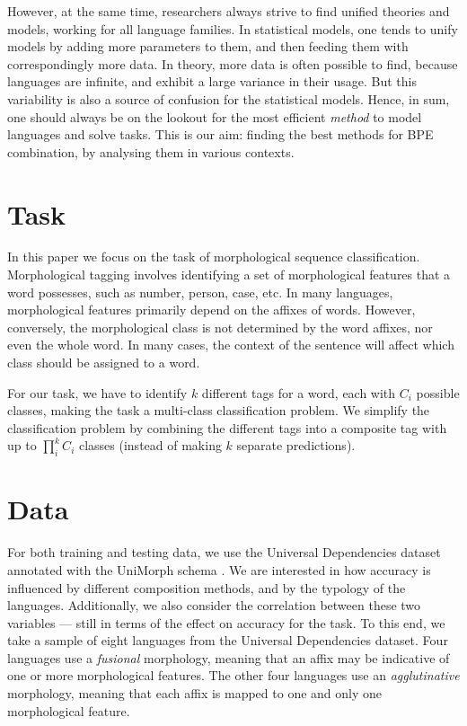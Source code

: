 \documentclass[11pt]{article}
\newcommand\citep{\cite}
\begin{document}
     However, at the same time, researchers always strive
     to find unified theories and models, working for all language
     families.
     In statistical models, one tends to unify models by adding more
     parameters to them, and then feeding them with correspondingly
     more data.  In theory, more data is often possible to find,
     because languages are infinite, and exhibit a large variance in
     their usage. But this variability is also a source of confusion
     for the statistical models. Hence, in sum, one should always be
     on the lookout for the most efficient \emph{method} to model
     languages and solve tasks. This is our aim: finding the best
     methods for BPE combination, by analysing them in various
     contexts.

    \section{Task}
             In this paper we focus on the task of
     morphological sequence classification. Morphological tagging
     involves identifying a set of morphological features that a word
     possesses, such as number, person, case, etc. In many languages,
     morphological features primarily depend on the affixes of
     words. However, conversely, the morphological class is not
     determined by the word affixes, nor even the whole word. In many
     cases, the context of the sentence will affect which class should
     be assigned to a word.

     For our task, we have to identify $k$ different tags for a word,
     each with $C_i$ possible classes, making the task a multi-class
     classification problem. We simplify the classification problem by
     combining the different tags into a composite tag with up to
     $\prod _i^k C_i$ classes (instead of making $k$ separate
     predictions).

    \section{Data}
    
    For both training and testing data, we use the Universal
    Dependencies dataset \citep{nivre2018} annotated with the UniMorph
    schema \citep{mccarthy2018marrying}. We are interested in how
    accuracy is influenced by different composition methods, and by
    the typology of the languages. Additionally, we also consider the
    correlation between these two variables --- still in terms of the
    effect on accuracy for the task. To this end, we take a sample
    of eight languages from the Universal Dependencies dataset. Four
    languages use a \textit{fusional} morphology, meaning that an
    affix may be indicative of one or more morphological features. The
    other four languages use an \textit{agglutinative} morphology,
    meaning that each affix is mapped to one and only one
    morphological feature.
\end{document}
